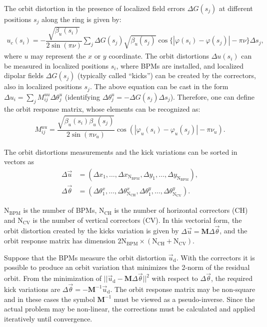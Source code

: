  The orbit distortion in the presence of localized field errors $\Delta G(s_j)$ at different positions $s_j$ along the ring is given by:
	\begin{align*}
		u_c(s_i) = -\dfrac{\sqrt{\beta_u(s_i)}}{2\sin{(\pi\nu)}} \sum_j \Delta G({s}_j) \sqrt{\beta_u({s}_j)}\cos\{ |\varphi(s_i) - \varphi({s}_j)| - \pi\nu \} \Delta s_j,
	\end{align*}
	where $u$ may represent the $x$ or $y$ coordinate.  The orbit distortions $\Delta u(s_i)$ can be measured in localized positions $s_i$, where BPMs are installed, and localized dipolar fields $\Delta G(s_j)$ (typically called ``kicks'') can be created by the correctors, also in localized positions $s_j$. The above equation can be cast in the form $\Delta u_i = \sum_{j} M_{ij}^{uu} \Delta \theta_{j}^u$ (identifying $\Delta \theta_{j}^u = -\Delta G(s_j) \Delta s_j$). Therefore, one can define the orbit response matrix, whose elements can be recognized as:
 \begin{align}
 M_{ij}^{uu} = \dfrac{\sqrt{\beta_{u}(s_i)\beta_{u}(s_j)}}{2\sin\left(\pi\nu_{u}\right)}\cos\left( |\varphi_{u}(s_i) - \varphi_{u}(s_j)| - \pi\nu_{u} \right).
 \end{align}

 The orbit distortions measurements and the kick variations can be sorted in vectors as
 \begin{align*}
	 \Delta \vec{u} &= \left(\Delta x_1, \ldots, \Delta x_{\mathrm{N}_{\mathrm{BPM}}}, \Delta y_1, \ldots, \Delta y_{\mathrm{N}_{\mathrm{BPM}}}\right), \\
	 \Delta \vec{\theta} &= \left(\Delta \theta_1^x, \ldots, \Delta \theta_{\mathrm{N}_{\mathrm{CH}}}^x, \Delta \theta_1^y, \ldots, \Delta \theta_{\mathrm{N}_{\mathrm{CV}}}^y\right).
 \end{align*}

 $\mathrm{N}_{\mathrm{BPM}}$ is the number of BPMs, $\mathrm{N}_{\mathrm{CH}}$ is the number of horizontal correctors (CH) and $\mathrm{N}_{\mathrm{CV}}$ is the number of vertical correctors (CV). In this vectorial form, the orbit distortion created by the kicks variation is given by $\Delta \vec{u} = \mathbf{M} \Delta \vec{\theta}$, and the orbit response matrix has dimension $2 \mathrm{N}_{\mathrm{BPM}} \times \left(\mathrm{N}_{\mathrm{CH}} + \mathrm{N}_{\mathrm{CV}}\right)$.

 Suppose that the BPMs measure the orbit distortion $\vec{u}_{\mathrm{d}}$. With the correctors it is possible to produce an orbit variation that minimizes the 2-norm of the residual orbit. From the minimization of $||\vec{u}_{\mathrm{d}} - \mathbf{M}\Delta \vec{\theta}||^2$ with respect to $\Delta\vec{\theta}$, the required kick variations are $\Delta \vec{\theta} = -\mathbf{M}^{-1}\vec{u}_{\mathrm{d}}$. The orbit response matrix may be non-square and in these cases the symbol $\mathbf{M}^{-1}$ must be viewed as a pseudo-inverse. Since the actual problem may be non-linear, the corrections must be calculated and applied iteratively until convergence.

